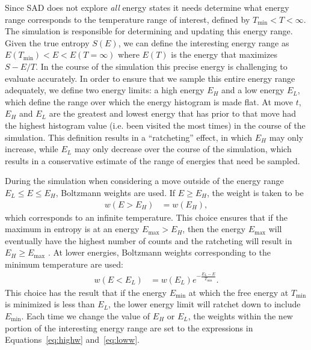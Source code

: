 \documentclass[letterpaper,twocolumn,amsmath,amssymb,pre,aps,10pt]{revtex4-1}
\begin{document}
Since SAD does not explore \emph{all} energy states it needs determine
what energy range corresponds to the temperature range of interest,
defined by $T_{\min}<T<\infty$.
The
simulation is responsible for determining and updating this energy
range.
Given the true entropy $S(E)$, we can define the interesting energy
range as
  $E(T_{\min}) <E< E(T=\infty)$
where $E(T)$ is the energy that maximizes $S-E/T$.  In the course of the
simulation this precise energy is challenging to evaluate accurately.
In order to ensure that we sample this entire energy range adequately,
we define two energy limits:  a high energy $E_H$ and a low
energy $E_L$, which define the range over which the energy histogram
is made flat. At move $t$, $E_H$ and $E_L$ are the greatest and lowest
energy that has prior to that move
had the highest histogram value (i.e. been visited the most times) in
the course of the simulation.
This definition results in a ``ratcheting'' effect, in which $E_H$
may only increase, while $E_L$ may only decrease over the course of the
simulation, which results in a conservative estimate of the range of
energies that need be sampled.

During the simulation when considering a move outside of the energy
range $E_L \le E \le E_H$, Boltzmann weights are used.  If $E\ge E_H$,
the weight is taken to be
\begin{align}\label{eq:highw}
  w(E>E_H) &= w(E_H),
\end{align}
which corresponds to an infinite temperature.
This choice ensures that
if the maximum in entropy is at an energy $E_{\max}>E_H$, then the energy
$E_{\max}$
will eventually have the highest number of counts and the ratcheting will
result in $E_H\ge E_{\max}$ .
At lower energies, Boltzmann weights corresponding to the minimum temperature
are used:
\begin{align}\label{eq:loww}
  w(E<E_L) &= w(E_L)e^{-\frac{E_L-E}{T_{\min}}}.
\end{align}
This choice has the result that if the energy $E_{\min}$ at which the free
energy at $T_{\min}$ is minimized is less than $E_L$, the lower energy
limit will ratchet down to include $E_{\min}$.
Each time we change the value of $E_H$ or $E_L$, the weights within the
new portion of the interesting energy range are set to the expressions
in Equations~\ref{eq:highw} and~\ref{eq:loww}.
\end{document}
